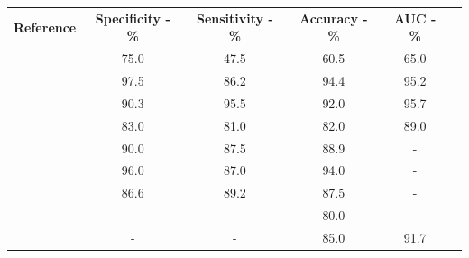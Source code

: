 \documentclass[11pt]{article}
\begin{document}
\begin{table}[]
    \centering
    \begin{tabular}{cccccc}\toprule
        \multirow{2}{*}{\textbf{Reference}} & \multirow{2}{*}{\textbf{Specificity - \%}} & \multirow{2}{*}{\textbf{Sensitivity - \%}} & \multirow{2}{*}{\textbf{Accuracy - \%}} & \multirow{2}{*}{\textbf{AUC - \%}} \\
        \\\midrule
        \cite{Tu2018}                       & 75.0                                       & 47.5                                       & 60.5                                    & 65.0                               \\
        \cite{Yi20181}                      & 97.5                                       & 86.2                                       & 94.4                                    & 95.2                               \\
        \cite{Yi2018}                       & 90.3                                       & 95.5                                       & 92.0                                    & 95.7                               \\
        \cite{Elmohr2019}                   & 83.0                                       & 81.0                                       & 82.0                                    & 89.0                               \\
        \cite{Torresan2021}                 & 90.0                                       & 87.5                                       & 88.9                                    & -                                  \\
        \cite{Kusunoki2022}                 & 96.0                                       & 87.0                                       & 94.0                                    & -                                  \\
        \cite{Liu2022}                      & 86.6                                       & 89.2                                       & 87.5                                    & -                                  \\
        \cite{Ho2019}                       & -                                          & -                                          & 80.0                                    & -                                  \\
        \cite{Liu2021}                      & -                                          & -                                          & 85.0                                    & 91.7                               \\

\end{tabular}
\end{table}
\end{document}
